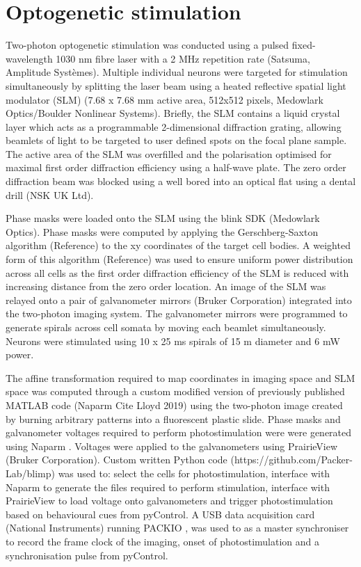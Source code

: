\section{Optogenetic stimulation}

Two-photon optogenetic stimulation was conducted using a pulsed fixed-wavelength 1030 nm fibre laser with a 2 MHz repetition rate (Satsuma, Amplitude Systèmes). Multiple individual neurons were targeted for stimulation simultaneously by splitting the laser beam using a heated reflective spatial light modulator (SLM) (7.68 x 7.68 mm active area, 512x512 pixels, Medowlark Optics/Boulder Nonlinear Systems). Briefly, the SLM contains a liquid crystal layer which acts as a programmable 2-dimensional diffraction grating, allowing beamlets of light to be targeted to user defined spots on the focal plane sample. The active area of the SLM was overfilled and the polarisation optimised for maximal first order diffraction efficiency using a half-wave plate. The zero order diffraction beam was blocked using a well bored into an optical flat using a dental drill (NSK UK Ltd).

Phase masks were loaded onto the SLM using the blink SDK (Medowlark Optics). Phase masks were computed by applying the Gerschberg-Saxton algorithm (Reference) to the xy coordinates of the target cell bodies. A weighted form of this algorithm (Reference) was used to ensure uniform power distribution across all cells as the first order diffraction efficiency of the SLM is reduced with increasing distance from the zero order location. An image of the SLM was relayed onto a pair of galvanometer mirrors (Bruker Corporation) integrated into the two-photon imaging system. The galvanometer mirrors were programmed to generate spirals across cell somata by moving each beamlet simultaneously. Neurons were stimulated using 10 x 25 ms spirals of 15 \textmu m diameter and 6 mW power.

The affine transformation required to map coordinates in imaging space and SLM space was computed through a custom modified version of previously published MATLAB code (Naparm Cite Lloyd 2019) using the two-photon image created by burning arbitrary patterns into a fluorescent plastic slide. Phase masks and galvanometer voltages required to perform photostimulation were were generated using Naparm \cite{russell_influence_2019}. Voltages were applied to the galvanometers using PrairieView (Bruker Corporation). Custom written Python code (https://github.com/Packer-Lab/blimp) was used to: select the cells for photostimulation, interface with Naparm to generate the files required to perform stimulation, interface with PrairieView to load voltage onto galvanometers and trigger photostimulation based on behavioural cues from pyControl. A USB data acquisition card (National Instruments) running PACKIO \cite{watson_packio_2016}, was used to as a master synchroniser to record the frame clock of the imaging, onset of photostimulation and a synchronisation pulse from pyControl.

